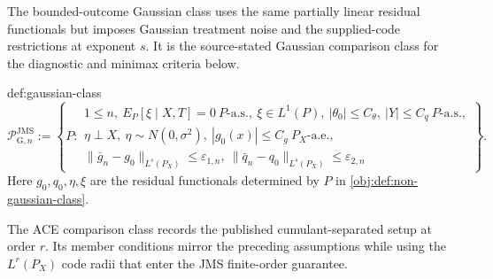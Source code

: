 \documentclass[11pt]{article}
\begin{document}
The bounded-outcome Gaussian class uses the same partially linear residual functionals but imposes Gaussian treatment noise and the supplied-code restrictions at exponent \(s\). It is the source-stated Gaussian comparison class for the diagnostic and minimax criteria below.

\begin{definitionv}{def:gaussian-class}
\[
\mathcal P_{\mathrm G,n}^{\mathrm{JMS}}:=\left\{P:\begin{array}{l}1\le n,\ E_P[\xi\mid X,T]=0\ P\text{-a.s.},\ \xi\in L^1(P),\ |\theta_0|\le C_{\theta},\ |Y|\le C_q\ P\text{-a.s.},\\ \eta\perp X,\ \eta\sim N(0,\sigma^2),\ |g_0(x)|\le C_g\ P_X\text{-a.e.},\\ \|\bar g_n-g_0\|_{L^s(P_X)}\le\varepsilon_{1,n},\ \|\bar q_n-q_0\|_{L^s(P_X)}\le\varepsilon_{2,n}\end{array}\right\}.
\]
Here \(g_0,q_0,\eta,\xi\) are the residual functionals determined by \(P\) in \cref{obj:def:non-gaussian-class}.
\end{definitionv}

The ACE comparison class records the published cumulant-separated setup at order \(r\). Its member conditions mirror the preceding assumptions while using the \(L^r(P_X)\) code radii that enter the JMS finite-order guarantee.
\end{document}
